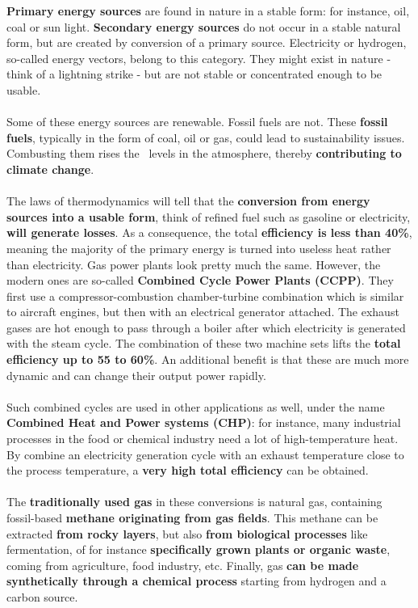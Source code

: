 \documentclass[../summary.tex]{subfiles}
\begin{document}
\textbf{Primary energy sources} are found in nature in a stable form: for instance, oil, coal or sun light. \textbf{Secondary energy sources} do not occur in a stable natural form, but are created by conversion of a primary source. Electricity or hydrogen, so-called energy vectors, belong to this category. They might exist in nature - think of a lightning strike - but are not stable or concentrated enough to be usable.
\\\\
Some of these energy sources are renewable. Fossil fuels are not. These \textbf{fossil fuels}, typically in the form of coal, oil or gas, could lead to sustainability issues. Combusting them rises the \COtwo\ levels in the atmosphere, thereby \textbf{contributing to climate change}.
\\\\
The laws of thermodynamics will tell that the \textbf{conversion from energy sources into a usable form}, think of refined fuel such as gasoline or electricity, \textbf{will generate losses}. As a consequence, the total \textbf{efficiency is less than 40\%}, meaning the majority of the primary energy is turned into useless heat rather than electricity. Gas power plants look pretty much the same. However, the modern ones are so-called \textbf{Combined Cycle Power Plants (CCPP)}. They first use a compressor-combustion chamber-turbine combination which is similar to aircraft engines, but then with an electrical generator attached. The exhaust gases are hot enough to pass through a boiler after which electricity is generated with the steam cycle. The combination of these two machine sets lifts the \textbf{total efficiency up to 55 to 60\%}. An additional benefit is that these are much more dynamic and can change their output power rapidly.
\\\\
Such combined cycles are used in other applications as well, under the name \textbf{Combined Heat and Power systems (CHP)}: for instance, many industrial processes in the food or chemical industry need a lot of high-temperature heat. By combine an electricity generation cycle with an exhaust temperature close to the process temperature, a \textbf{very high total efficiency} can be obtained.
\\\\
The \textbf{traditionally used gas} in these conversions is natural gas, containing fossil-based \textbf{methane originating from gas fields}. This methane can be extracted \textbf{from rocky layers}, but also \textbf{from biological processes} like fermentation, of for instance \textbf{specifically grown plants or organic waste}, coming from agriculture, food industry, etc. Finally, gas \textbf{can be made synthetically through a chemical process} starting from hydrogen and a carbon source.
\end{document}
